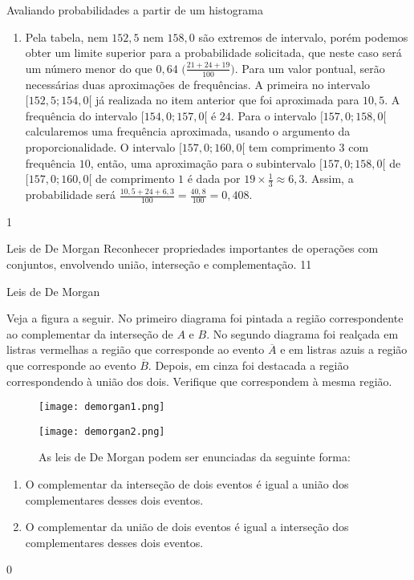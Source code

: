 \begin{answer}{Avaliando probabilidades a partir de um histograma}
{\begin{enumerate}
\item Pela tabela, nem $152,5$ nem $158,0$ são extremos de intervalo, porém podemos obter um limite superior para a probabilidade solicitada, que neste caso será um número menor do que $0,64$ $\big(\frac{21+24+19}{100}\big)$. Para um valor pontual, serão necessárias duas aproximações de frequências. A primeira no intervalo $[152{,}5; 154{,}0[$ já realizada no item anterior que foi aproximada para $10{,}5$. A frequência do intervalo $[154{,}0 ; 157{,}0 [$ é $24$. Para o intervalo $[157{,}0 ; 158{,}0[$ calcularemos uma frequência aproximada, usando o argumento da proporcionalidade. O intervalo $[157{,}0 ; 160{,}0[$ tem comprimento $3$ com frequência $10$, então, uma aproximação para o subintervalo $[157{,}0 ; 158{,}0[$ de $[157{,}0 ; 160{,}0[$ de comprimento $1$ é dada por $19\times\frac{1}{3}\approx6{,}3$. Assim, a probabilidade será $\frac{10{,}5+24+6{,}3}{100}=\frac{40{,}8}{100}=0{,}408$.
\end{enumerate}
}{1}
\end{answer}
\begin{objectives}{Leis de De Morgan}
{
Reconhecer propriedades importantes de operações com conjuntos, envolvendo união, interseção e complementação.
}{1}{1}
\end{objectives}
\begin{answer}{Leis de De Morgan}
{
Veja a figura a seguir. No primeiro diagrama foi pintada a região correspondente ao complementar da interseção de $A$ e $B$. No segundo diagrama foi realçada em listras vermelhas a região que corresponde ao evento $\overline{A}$ e em listras azuis a região que corresponde ao evento $\overline{B}$. Depois, em cinza foi destacada a região correspondendo à união dos dois. Verifique que correspondem à mesma região.
\begin{figure}[H]
\centering

\texttt{[image: demorgan1.png]}

\texttt{[image: demorgan2.png]}
\caption{As leis de De Morgan podem ser enunciadas da seguinte forma:}

\end{figure}

\begin{enumerate}
\item O complementar da interseção de dois eventos é igual a união dos complementares desses dois eventos.
\item O complementar da união de dois eventos é igual a interseção dos complementares desses dois eventos.
\end{enumerate}
}{0}
\end{answer}
